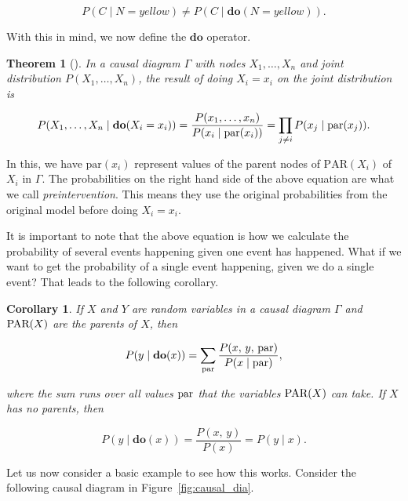 \documentclass{article}
\newtheorem{theorem}{Theorem}[section]
\newtheorem{corollary}{Corollary}[theorem]
\begin{document}
\begin{equation*}
P(C \;|\;N = \textit{yellow}) \neq P(C\;|\; \textbf{do}(N=\textit{yellow})).
\end{equation*}

With this in mind, we now define the $\textbf{do}$ operator.

\begin{theorem}[{{\cite{pearl2009causal}}}]
    In a causal diagram $\Gamma$ with nodes $X_1,\dots, X_n$ and joint distribution 
    $P(X_1, \dots, X_n)$, the result of doing $X_i = x_i$ on the joint distribution is

    \[
        P(X_1, \dots, X_n \;|\; \textbf{do}(X_i = x_i)) = \frac{P(x_1,\dots,x_n)}{P(x_i\;|\; \textup{par}(x_i))} = \prod_{j\neq i}P(x_j\;|\; \textup{par}(x_j)).
    \]
    \label{theorem:do}
\end{theorem}

In this, we have $\text{par}(x_i)$ represent values of the parent nodes of $\text{PAR}(X_i)$ of $X_i$ in $\Gamma$.
The probabilities on the right hand side of the above equation are what we call \textit{preintervention}. 
This means they use the original probabilities from the original model before doing $X_i = x_i$.

It is important to note that the above equation is how we calculate the probability of several events 
happening given one event has happened. What if we want to get the probability of a single event happening, 
given we do a single event? That leads to the following corollary.

\begin{corollary}
    If $X$ and $Y$ are random variables in a causal diagram $\Gamma$ and $\textup{PAR}(X)$ are the parents of $X$, then

    \[P(y\;|\;  \textbf{do}(x)) = \sum_{\textup{par}}\frac{P(x,\,y,\,\textup{par})}{P(x\;|\; \textup{par})},\]

    where the sum runs over all values $\textup{par}$ that the variables $\textup{PAR}(X)$ can take. If $X$ has no parents, then

    \[P(y\;|\; \textbf{do}(x)) = \frac{P(x,\,y)}{P(x)} = P(y\;|\; x).\]
    \label{corollary:do}
\end{corollary}

Let us now consider a basic example to see how this works. Consider the following causal diagram in Figure~\ref{fig:causal_dia}.
\end{document}
